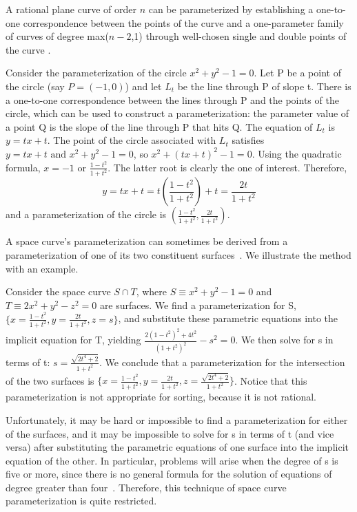A rational plane curve of order $n$ can be parameterized by
establishing a one-to-one correspondence 
between the points of the curve and a one-parameter family of curves 
of degree max($n-2$,1) through well-chosen single and
double points of the curve \cite{abba3}.
%
\begin{example}
Consider the parameterization of the circle \( x^{2}+y^{2}-1=0 \).
Let P be a point of the circle (say $P = (-1,0)$)
and let $L_{t}$ be the line through P of slope t.
There is a one-to-one correspondence between the lines through P and the
points of the circle, which can be used to construct a parameterization:
the parameter value of a point Q is the slope of the line through P that
hits Q.
The equation of $L_{t}$ is \( y = tx + t \).
The point of the circle associated with $L_{t}$ satisfies 
{ \( y = tx + t \mbox{ and } x^{2} + y^{2} - 1 = 0 \)}, so
\( x^{2} + (tx+t)^{2} - 1 = 0 \).
Using the quadratic formula, \( x = -1 \mbox{ or } \frac{1-t^{2}}{1+t^{2}} \).
The latter root is clearly the one of interest.
Therefore, 
\[ y = tx + t = t(\frac{1-t^{2}}{1+t^{2}})+t = \frac{2t}{1+t^{2}} \]
and a parameterization of the circle is
$(\frac{1-t^{2}}{1+t^{2}},\frac{2t}{1+t^{2}})$.
\end{example}
%

A space curve's parameterization can sometimes be derived from a 
parameterization of one of its two constituent 
surfaces~\cite{hopcroft-krafft,levin79}.
We illustrate the method with an example.
%
\begin{example}
Consider the space curve $S \cap T$, where 
$S \equiv x^{2} + y^{2} - 1 = 0$ and
$T \equiv 2x^{2} + y^{2} - z^{2} = 0$ are surfaces.
We find a parameterization for S,
$\{ x = \frac{1-t^{2}}{1+t^{2}}, y = \frac{2t}{1+t^{2}}, z=s\}$, and
substitute these parametric equations into the implicit equation for T, 
yielding $\frac{2(1-t^{2})^{2} + 4t^{2}}{(1+t^{2})^{2}} - s^{2} = 0$.
We then solve for s in terms of t: $s = \frac{\sqrt{2t^{4}+2}}{1+t^{2}}$.
We conclude that a parameterization for 
the intersection of the two surfaces is 
$\{ x = \frac{1-t^{2}}{1+t^{2}}, y = \frac{2t}{1+t^{2}}, 
z= \frac{\sqrt{2t^{4}+2}}{1+t^{2}}\}$.
Notice that this parameterization is not appropriate for sorting, 
because it is not rational.
\end{example}
%
Unfortunately, it may be hard or impossible to find a parameterization
for either of the surfaces, and it may be 
impossible to solve for s in terms of t (and vice versa) after
substituting the parametric equations of one surface into the implicit
equation of the other.
In particular, problems will arise when the degree of s is five or more,
since there is no general formula for the solution of equations of degree 
greater than four~\cite{hernstein}.
Therefore, this technique of space curve parameterization is quite 
restricted.


